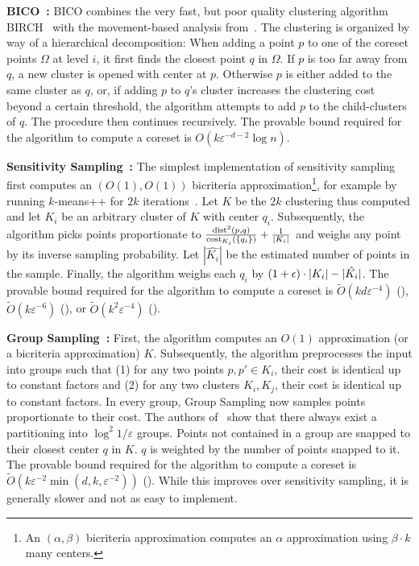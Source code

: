 {\bf BICO~\cite{FGSSS13}:} BICO combines the very fast, but poor quality clustering algorithm BIRCH~\cite{ZRL97} with the movement-based analysis from~\cite{FrahlS2005,HaM04}. The clustering is organized by way of a hierarchical decomposition: When adding a point $p$ to one of the coreset points $\Omega$ at level $i$, it first finds the closest point $q$ in $\Omega$. If $p$ is too far away from $q$, a new cluster is opened with center at $p$. Otherwise $p$ is either added to the same cluster as $q$, or, if adding $p$ to $q$'s cluster increases the clustering cost beyond a certain threshold, the algorithm attempts to add $p$ to the child-clusters of $q$. The procedure then continues recursively. The provable bound required for the algorithm to compute a coreset is $O\left(k\varepsilon^{-d-2}\log n\right)$.

{\bf Sensitivity Sampling~\cite{FL11}:} The simplest implementation of sensitivity sampling first computes an $(O(1),O(1))$ bicriteria approximation\footnote{An $(\alpha,\beta)$ bicriteria approximation computes an $\alpha$ approximation using $\beta\cdot k$ many centers.}, for example by running $k$-means++ for $2k$ iterations~\cite{Wei16}. Let $K$ be the $2k$ clustering thus computed and let $K_i$ be an arbitrary cluster of $K$ with center $q_i$. Subsequently, the algorithm picks points proportionate to $\frac{\text{dist}^2(p,q)}{\text{cost}_{K_i}(\{q_i\})} + \frac{1}{|K_i|}$ and weighs any point by its inverse sampling probability. Let $|\hat{K_i}|$ be the estimated number of points in the sample. Finally, the algorithm weighs each $q_i$ by $(1+{\epsilon})\cdot |K_i| - |\hat{K_i}|$. The provable bound required for the algorithm to compute a coreset is $\tilde O\left(kd\varepsilon^{-4}\right)$ (\cite{FL11}),
$\tilde O\left(k\varepsilon^{-6}\right)$ (\cite{huang2020coresets}), or $\tilde O\left(k^2\varepsilon^{-4}\right)$ (\cite{BravermanJKW21}).

{\bf Group Sampling~\cite{Cohen-AddadSS21}:} First, the algorithm computes an $O(1)$ approximation (or a bicriteria approximation) $K$. Subsequently, the algorithm preprocesses the input into groups such that (1) for any two points $p,p'\in K_i$, their cost is identical up to constant factors and (2) for any two clusters $K_i,K_j$, their cost is identical up to constant factors. In every group, Group Sampling now samples points proportionate to their cost. The authors of~\cite{Cohen-AddadSS21} show that there always exist a partitioning into $\log^2 1/\varepsilon$ groups. Points not contained in a group are snapped to their closest center $q$ in $K$. $q$ is weighted by the number of points snapped to it. The provable bound required for the algorithm to compute a coreset is $\tilde O\left(k\varepsilon^{-2}\min(d,k,\varepsilon^{-2})\right)$ (\cite{CLSS22}). While this improves over sensitivity sampling, it is generally slower and not as easy to implement.

